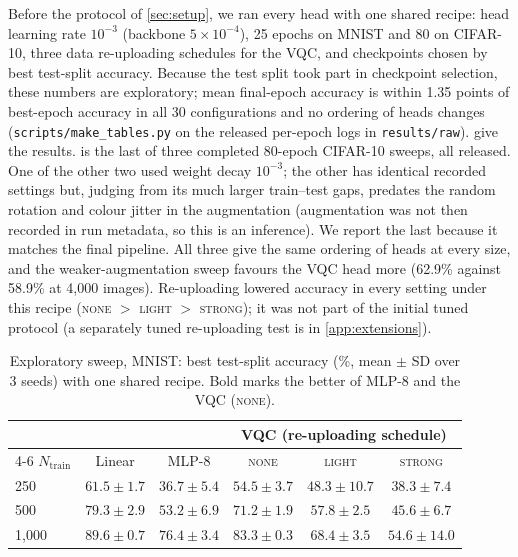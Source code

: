 Before the protocol of \cref{sec:setup}, we ran every head with one shared recipe: head
learning rate $10^{-3}$ (backbone $5\times10^{-4}$), 25 epochs on MNIST and 80 on CIFAR-10,
three data re-uploading schedules for the VQC, and checkpoints chosen by best test-split
accuracy. Because the test split took part in checkpoint selection, these numbers are
exploratory; mean final-epoch accuracy is within 1.35 points of best-epoch accuracy in all 30
configurations and no ordering of heads changes (\texttt{scripts/make\_tables.py} on the
released per-epoch logs in \texttt{results/raw}).  give the results.
 is the last of three completed 80-epoch CIFAR-10 sweeps, all released. One of the
other two used weight decay $10^{-3}$; the other has identical recorded settings but, judging from its
much larger train--test gaps, predates the random rotation and colour jitter in the augmentation
(augmentation was not then recorded in run metadata, so this is an inference). We report the last
because it matches the final pipeline. All three give the same ordering of heads at every size, and the
weaker-augmentation sweep favours the VQC head more (62.9\% against 58.9\% at 4,000 images).
Re-uploading lowered accuracy in every setting under this recipe (\textsc{none} $>$
\textsc{light} $>$ \textsc{strong}); it was not part of the initial tuned protocol (a separately tuned re-uploading test is in \cref{app:extensions}).

\begin{table}[h]
\centering
\caption{Exploratory sweep, MNIST: best test-split accuracy (\%, mean $\pm$ SD over 3 seeds)
with one shared recipe. Bold marks the better of MLP-8 and the VQC (\textsc{none}).}
\label{tab:mnist}
\small
\begin{tabular}{lccccc}
\toprule
& & & \multicolumn{3}{c}{VQC (re-uploading schedule)} \\
\cmidrule(lr){4-6}
$N_\mathrm{train}$ & Linear & MLP-8 & \textsc{none} & \textsc{light} & \textsc{strong} \\
\midrule
250   & $61.5 \pm 1.7$ & $36.7 \pm 5.4$ & $\mathbf{54.5 \pm 3.7}$ & $48.3 \pm 10.7$ & $38.3 \pm 7.4$ \\
500   & $79.3 \pm 2.9$ & $53.2 \pm 6.9$ & $\mathbf{71.2 \pm 1.9}$ & $57.8 \pm 2.5$ & $45.6 \pm 6.7$ \\
1,000 & $89.6 \pm 0.7$ & $76.4 \pm 3.4$ & $\mathbf{83.3 \pm 0.3}$ & $68.4 \pm 3.5$ & $54.6 \pm 14.0$ \\
\bottomrule
\end{tabular}
\end{table}

